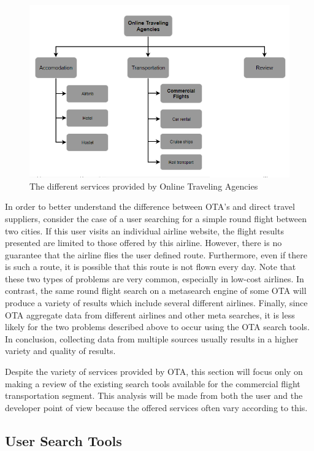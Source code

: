 \begin{figure}[]
  \centering
  \includegraphics[width=\textwidth]{./Figures/introduction/services_OTA.png}
  \caption{The different services provided by Online Traveling Agencies}
  \label{fig:ota_services}  
\end{figure}

In order to better understand the difference between OTA's and direct travel suppliers, 
consider the case of a user searching for a simple round flight between two cities. 
If this user visits an individual airline website, the flight results presented are limited to those offered by this airline.
However, there is no guarantee that the airline flies the user defined route.
Furthermore, even if there is such a route, it is possible that this route is not flown every day.
Note that these two types of problems are very common, especially in low-cost airlines.
In contrast, the same round flight search on a metasearch engine of some OTA 
will produce a variety of results which include several different airlines.
Finally, since OTA aggregate data from different airlines and other meta searches,
it is less likely for the two problems described above to occur using the OTA search tools.
In conclusion, collecting data from multiple sources usually results in a higher variety and quality of results.

Despite the variety of services provided by OTA, this section will focus only on making a review of the existing search tools available for the commercial flight
transportation segment. This analysis will be made from both the user and the developer point of view
because the offered services often vary according to this. 


\subsection{User Search Tools}


